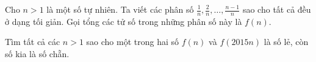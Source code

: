\ifshowproblem
\begin{problem}\label{example:RUS-2015-MO-11-P2}
    Cho \( n > 1 \) là một số tự nhiên. Ta viết các phân số \( \frac{1}{n}, \frac{2}{n}, \ldots, \frac{n-1}{n} \)
    sao cho tất cả đều ở dạng tối giản. Gọi tổng các tử số trong những phân số này là \( f(n) \).
    
    Tìm tất cả các \( n > 1 \) sao cho một trong hai số \( f(n) \) và \( f(2015n) \) là số lẻ, còn số kia là số chẵn.
\end{problem}
\fi

\footnotemark
{}
\fi